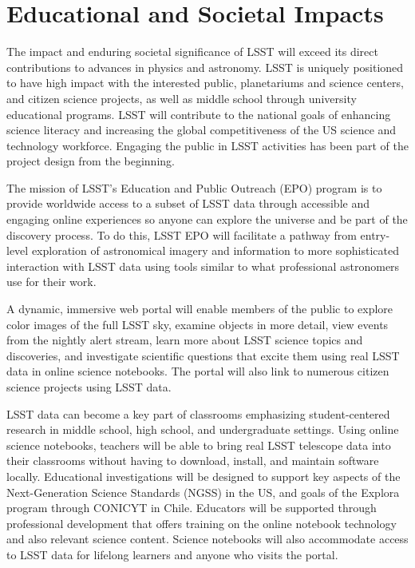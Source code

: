 \section{Educational and Societal Impacts}
\label{Sec:impact}

The impact and enduring societal significance of LSST will exceed its direct contributions to advances in physics and astronomy.  LSST is uniquely positioned to have high impact with the interested public, planetariums and science centers, and citizen science projects, as well as middle school through university educational programs. LSST will contribute to the national goals of enhancing science literacy and increasing the global competitiveness of the US science and technology workforce. Engaging the public in LSST activities has been part of the project design from the beginning.

The mission of LSST's Education and Public Outreach (EPO) program is to provide worldwide access to a subset of LSST data through accessible and engaging online experiences so anyone can explore the universe and be part of the discovery process. To do this, LSST EPO will facilitate a pathway from entry-level exploration of astronomical imagery and information to more sophisticated interaction with LSST data using tools similar to what professional astronomers use for their work.

A dynamic, immersive web portal will enable members of the public to explore color images of the full LSST sky, examine objects in more detail, view events from the nightly alert stream, learn more about LSST science topics and discoveries, and investigate scientific questions that excite them using real LSST data in online science notebooks. The portal will also link to numerous citizen science projects using LSST data.

LSST data can become a key part of classrooms emphasizing student-centered research in middle school, high school, and undergraduate settings. Using online science notebooks, teachers will be able to bring real LSST telescope data into their classrooms without having to download, install, and maintain software locally. Educational investigations will be designed to support key aspects of the Next-Generation Science Standards (NGSS) in the US, and goals of the Explora program through CONICYT in Chile. Educators will be supported through professional development that offers training on the online notebook technology and also relevant science content. Science notebooks will also accommodate access to LSST data for lifelong learners and anyone who visits the portal.

